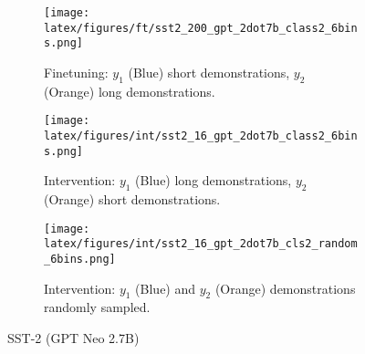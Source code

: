 \begin{figure*}[t!]
    \centering
    \begin{minipage}[t]{\linewidth}
        \begin{subfigure}{0.31\linewidth}
            \centering
            \texttt{[image: latex/figures/ft/sst2\_200\_gpt\_2dot7b\_class2\_6bins.png]}
            \caption{Finetuning: $y_1$ (Blue) short demonstrations, $y_2$ (Orange) long demonstrations.}
        \end{subfigure}%
        \hfill
        \begin{subfigure}{0.31\linewidth}
            \centering
            \texttt{[image: latex/figures/int/sst2\_16\_gpt\_2dot7b\_class2\_6bins.png]}
            \caption{Intervention: $y_1$ (Blue) long demonstrations, $y_2$ (Orange) short demonstrations.}
        \end{subfigure}
        \hfill
        \begin{subfigure}{0.31\linewidth}
            \centering
            \texttt{[image: latex/figures/int/sst2\_16\_gpt\_2dot7b\_cls2\_random\_6bins.png]}
            \caption{Intervention: $y_1$ (Blue) and $y_2$ (Orange) demonstrations randomly sampled.}
        \end{subfigure}
    \end{minipage}%
    \hfill
    \begin{minipage}[c]{\linewidth}
        \caption{SST-2 (GPT Neo 2.7B)}
    \end{minipage}
\end{figure*}